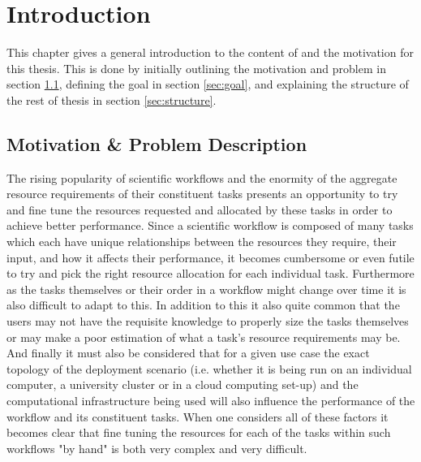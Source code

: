 
\cleardoublepage
\chapter{Introduction}
\label{cha:introduction}

This chapter gives a general introduction to the content of and the motivation for this thesis. This is done by initially outlining the motivation and problem in section \ref{sec:motivation}, defining the goal in section \ref{sec:goal}, and explaining the structure of the rest of thesis in section \ref{sec:structure}.

\section{Motivation \& Problem Description}
\label{sec:motivation}


The rising popularity of scientific workflows and the enormity of the aggregate resource requirements of their constituent tasks \cite{ResourceProvisioning} presents an opportunity to try and fine tune the resources requested and allocated by these tasks in order to achieve better performance. Since a scientific workflow is composed of many tasks which each have unique relationships between the resources they require, their input, and how it affects their performance, it becomes cumbersome or even futile to try and pick the right resource allocation for each individual task. Furthermore as the tasks themselves or their order in a workflow might change over time it is also difficult to adapt to this. In addition to this it also quite common that the users may not have the requisite knowledge to properly size the tasks themselves or may make a poor estimation \cite{Predictability} of what a task's resource requirements may be. And finally it must also be considered that for a given use case the exact topology of the deployment scenario (i.e. whether it is being run on an individual computer, a university cluster or  in a cloud computing set-up) and the computational infrastructure being used will also influence the performance of the workflow and its constituent tasks.  When one considers all of these factors it becomes clear that fine tuning the resources for each of the tasks within such workflows "by hand" is both very complex and very difficult. 

